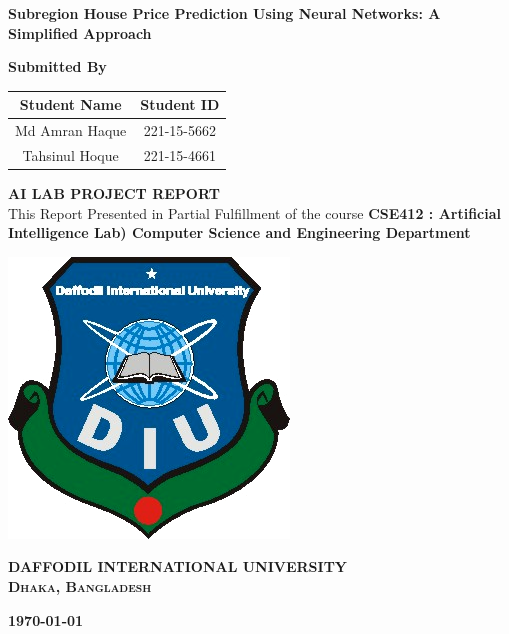 \begin{titlepage}

\vspace*{2cm} %

\begin{center}
{\huge\bf Subregion House Price Prediction Using Neural Networks: A Simplified Approach}
\end{center}

\vspace{2cm}

\begin{center}
\Large \bf Submitted By
\end{center}

\vspace{.1cm}

\begin{table}[h!]
\centering
\begin{tabular}{|c|c|}
\hline
\textbf{      Student Name      } & \textbf{  Student ID  } \\
\hline
Md Amran Haque   & 221-15-5662 \\
\hline
Tahsinul Hoque &  221-15-4661 \\
\hline
\end{tabular}
\end{table}

\vspace{2cm}

\begin{center}
{\Large\bf AI LAB PROJECT REPORT}\\
\vspace{0.2cm}
\Large This Report Presented in Partial Fulfillment of the course  \textbf{CSE412 : Artificial Intelligence Lab)
 Computer Science and Engineering Department}
\end{center}

\vspace{2cm}

\begin{center}
\includegraphics[scale=0.5]{./figures/DIU Logo}
\end{center}

\begin{center}
	\Large\textbf{DAFFODIL INTERNATIONAL UNIVERSITY}\\
 \textbf{\textsc{Dhaka, Bangladesh}}
\end{center}

\begin{center}
\textbf{\today}
\end{center}

\end{titlepage}
